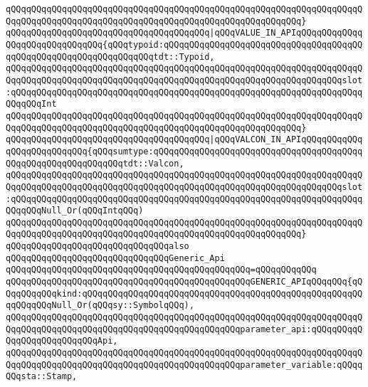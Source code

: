 \verb|qQQqqQQqqQQqqQQqqQQqqQQqqQQqqQQqqQQqqQQqqQQqqQQqqQQqqQQqqQQqqQQqqQQqqQQqqQQqqQQqqQQqqQQqqQQqqQQqqQQqqQQqqQQqqQQqqQQqqQQqqQQqqQQq}|\newline
\verb|qQQqqQQqqQQqqQQqqQQqqQQqqQQqqQQqqQQqqQQq|\verb#|qQQqVALUE_IN_APIqQQqqQQqqQQqqQQqqQQqqQQqqQQqqQQq{qQQqtypoid:qQQqqQQqqQQqqQQqqQQqqQQqqQQqqQQqqQQqqQQqqQQqqQQqqQQqqQQqqQQqqQQqqQQqtdt::Typoid,#\newline
\verb|qQQqqQQqqQQqqQQqqQQqqQQqqQQqqQQqqQQqqQQqqQQqqQQqqQQqqQQqqQQqqQQqqQQqqQQqqQQqqQQqqQQqqQQqqQQqqQQqqQQqqQQqqQQqqQQqqQQqqQQqqQQqqQQqqQQqqQQqslot:qQQqqQQqqQQqqQQqqQQqqQQqqQQqqQQqqQQqqQQqqQQqqQQqqQQqqQQqqQQqqQQqqQQqqQQqqQQqInt|\newline
\verb|qQQqqQQqqQQqqQQqqQQqqQQqqQQqqQQqqQQqqQQqqQQqqQQqqQQqqQQqqQQqqQQqqQQqqQQqqQQqqQQqqQQqqQQqqQQqqQQqqQQqqQQqqQQqqQQqqQQqqQQqqQQqqQQq}|\newline
\verb|qQQqqQQqqQQqqQQqqQQqqQQqqQQqqQQqqQQqqQQq|\verb#|qQQqVALCON_IN_APIqQQqqQQqqQQqqQQqqQQqqQQqqQQq{qQQqsumtype:qQQqqQQqqQQqqQQqqQQqqQQqqQQqqQQqqQQqqQQqqQQqqQQqqQQqqQQqqQQqqQQqtdt::Valcon,#\newline
\verb|qQQqqQQqqQQqqQQqqQQqqQQqqQQqqQQqqQQqqQQqqQQqqQQqqQQqqQQqqQQqqQQqqQQqqQQqqQQqqQQqqQQqqQQqqQQqqQQqqQQqqQQqqQQqqQQqqQQqqQQqqQQqqQQqqQQqqQQqslot:qQQqqQQqqQQqqQQqqQQqqQQqqQQqqQQqqQQqqQQqqQQqqQQqqQQqqQQqqQQqqQQqqQQqqQQqqQQqNull_Or(qQQqIntqQQq)|\newline
\verb|qQQqqQQqqQQqqQQqqQQqqQQqqQQqqQQqqQQqqQQqqQQqqQQqqQQqqQQqqQQqqQQqqQQqqQQqqQQqqQQqqQQqqQQqqQQqqQQqqQQqqQQqqQQqqQQqqQQqqQQqqQQqqQQq}|\newline
\newline
\verb|qQQqqQQqqQQqqQQqqQQqqQQqqQQqqQQqalso|\newline
\verb|qQQqqQQqqQQqqQQqqQQqqQQqqQQqqQQqGeneric_Api|\newline
\verb|qQQqqQQqqQQqqQQqqQQqqQQqqQQqqQQqqQQqqQQqqQQqqQQq=qQQqqQQqqQQq|\newline
\verb|qQQqqQQqqQQqqQQqqQQqqQQqqQQqqQQqqQQqqQQqqQQqqQQqGENERIC_APIqQQqqQQq{qQQqqQQqqQQqkind:qQQqqQQqqQQqqQQqqQQqqQQqqQQqqQQqqQQqqQQqqQQqqQQqqQQqqQQqqQQqqQQqNull_Or(qQQqsy::SymbolqQQq),|\newline
\verb|qQQqqQQqqQQqqQQqqQQqqQQqqQQqqQQqqQQqqQQqqQQqqQQqqQQqqQQqqQQqqQQqqQQqqQQqqQQqqQQqqQQqqQQqqQQqqQQqqQQqqQQqqQQqqQQqqQQqparameter_api:qQQqqQQqqQQqqQQqqQQqqQQqqQQqApi,|\newline
\verb|qQQqqQQqqQQqqQQqqQQqqQQqqQQqqQQqqQQqqQQqqQQqqQQqqQQqqQQqqQQqqQQqqQQqqQQqqQQqqQQqqQQqqQQqqQQqqQQqqQQqqQQqqQQqqQQqqQQqparameter_variable:qQQqqQQqsta::Stamp,|\newline
